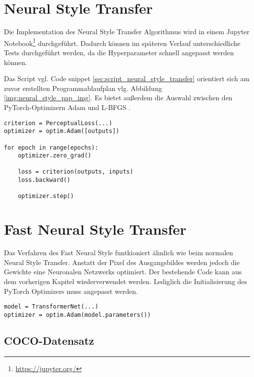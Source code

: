 \section{Neural Style Transfer}

Die Implementation des Neural Style Transfer Algorithmus wird in einem Jupyter Notebook\footnote{\url{https://jupyter.org/}} durchgeführt. 
Dadurch können im späteren Verlauf unterschiedliche Tests durchgeführt werden, da die Hyperparameter schnell angepasst werden können.

Das Script vgl. Code snippet \ref{sec:script_neural_style_transfer} orientiert sich am zuvor erstellten Programmablaufplan vlg. Abbildung \ref{img:neural_style_pap_img}. Es bietet außerdem die Auswahl zwischen den PyTorch-Optimizern Adam und L-BFGS \cite{Liu1989}.

\begin{listing}[H]
\begin{verbatim}
criterion = PerceptualLoss(...)
optimizer = optim.Adam([outputs])

for epoch in range(epochs):
    optimizer.zero_grad()

    loss = criterion(outputs, inputs)
    loss.backward()

    optimizer.step()    
\end{verbatim}
\end{listing}

\section{Fast Neural Style Transfer}

Das Verfahren des Fast Neural Style funtkioniert ähnlich wie beim normalen Neural Style Transfer.
Anstatt der Pixel des Ausgangsbildes werden jedoch die Gewichte eine Neuronalen Netzwerks optimiert.
Der bestehende Code kann aus  dem vorherigen Kapitel wiederverwendet werden. 
Lediglich die Initialisierung des PyTorch Optimizers muss angepasst werden.

\begin{listing}[H]
\begin{verbatim}
model = TransformerNet(...)
optimizer = optim.Adam(model.parameters())
\end{verbatim}
\end{listing}

\subsection{COCO-Datensatz}

